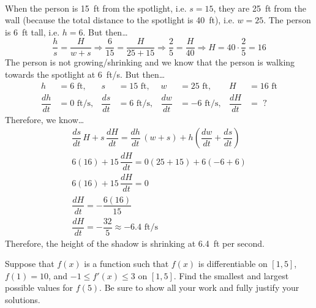 \documentclass[12pt,letterpaper]{exam}
\begin{document}
\begin{questions}
{\[\begin{gathered}
	\end{gathered}
	\]
When the person is 15~ft from the spotlight, i.e. $s= 15$, they are 25~ft from the wall (because the total distance to the spotlight is 40~ft), i.e. $w= 25$. The person is 6~ft tall, i.e. $h= 6$. But then\dots
	\[
	\dfrac{h}{s}= \dfrac{H}{w + s} \Longrightarrow \dfrac{6}{15}= \dfrac{H}{25 + 15} \Longrightarrow \dfrac{2}{5}= \dfrac{H}{40} \Longrightarrow H= 40 \cdot \dfrac{2}{5}= 16
	\]
The person is not growing/shrinking and we know that the person is walking towards the spotlight at 6~ft/s. But then\dots
	\[
	\begin{aligned}
	h&= 6 \text{ ft}, & s&= 15 \text{ ft}, & w&= 25 \text{ ft}, & H&= 16 \text{ ft} \\
	\dfrac{dh}{dt}&= 0 \text{ ft/s}, & \dfrac{ds}{dt}&= 6 \text{ ft/s}, & \dfrac{dw}{dt}&= -6 \text{ ft/s}, & \dfrac{dH}{dt}&= \,\, ?
	\end{aligned}
	\]
Therefore, we know\dots
	\[
	\begin{gathered}
	\dfrac{ds}{dt} \,H + s \, \dfrac{dH}{dt}= \dfrac{dh}{dt} \,(w + s) + h \left( \dfrac{dw}{dt} + \dfrac{ds}{dt} \right) \\[0.3cm]
	6(16) + 15 \, \dfrac{dH}{dt}= 0 (25 + 15) + 6 \left( -6 + 6 \right) \\[0.3cm]
	6(16) + 15 \, \dfrac{dH}{dt}= 0 \\
	\dfrac{dH}{dt}= -\dfrac{6(16)}{15} \\
	\dfrac{dH}{dt}= -\dfrac{32}{5} \approx -6.4 \text{ ft/s}
	\end{gathered}
	\]
Therefore, the height of the shadow is shrinking at 6.4~ft per second.
}



\newpage
\question[10] Suppose that $f(x)$ is a function such that $f(x)$ is differentiable on $[1, 5]$, $f(1)= 10$, and $-1 \leq f'(x) \leq 3$ on $[1, 5]$. Find the smallest and largest possible values for $f(5)$. Be sure to show all your work and fully justify your solutions. \par\vspace{1cm}


\end{questions}
\end{document}
